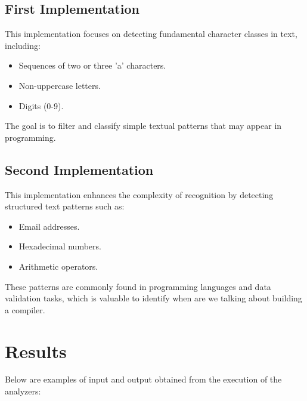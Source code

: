 \documentclass[a4paper,11pt]{scrarticle}
\begin{document}
    \subsection{First Implementation}
    This implementation focuses on detecting fundamental character classes in text, including:
    \begin{itemize}
        \item Sequences of two or three 'a' characters.
        \item Non-uppercase letters.
        \item Digits (0-9).
    \end{itemize}
    The goal is to filter and classify simple textual patterns that may appear in programming.

    \subsection{Second Implementation}
    This implementation enhances the complexity of recognition by detecting structured text patterns such as:
    \begin{itemize}
        \item Email addresses.
        \item Hexadecimal numbers.
        \item Arithmetic operators.
    \end{itemize}
    These patterns are commonly found in programming languages and data validation tasks, which is valuable to identify when are we talking about building a compiler.
    \newpage
    \section{Results}
    Below are examples of input and output obtained from the execution of the analyzers:
\end{document}
